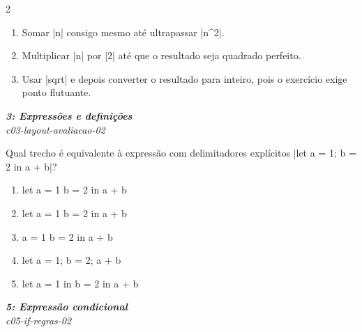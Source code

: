 \documentclass[a4paper,10pt,brazil]{article}
\begin{document}
\begin{multicols}{2}
\begin{enumerate}
  \item Somar \haskellinline|n| consigo mesmo até ultrapassar \haskellinline|n^2|.

  \item Multiplicar \haskellinline|n| por \haskellinline|2| até que o resultado seja quadrado perfeito.

  \item Usar \haskellinline|sqrt| e depois converter o resultado para inteiro, pois o exercício exige ponto flutuante.


\end{enumerate}

\begin{flushright}
  \footnotesize
  \textit{\textbf{3: Expressões e definições}}\\
  \textit{c03-layout-avaliacao-02}\\

\end{flushright}
Qual trecho é equivalente à expressão com delimitadores explícitos \haskellinline|let { a = 1; b = 2 } in a + b|?

\begin{enumerate}
  \item \begin{haskellcode}
let a = 1
    b = 2
in a + b
\end{haskellcode}

  \item \begin{haskellcode}
let a = 1
  b = 2
in a + b
\end{haskellcode}

  \item \begin{haskellcode}
a = 1
b = 2
in a + b
\end{haskellcode}

  \item \begin{haskellcode}
let a = 1; b = 2; a + b
\end{haskellcode}

  \item \begin{haskellcode}
let a = 1
in b = 2
in a + b
\end{haskellcode}


\end{enumerate}

\begin{flushright}
  \footnotesize
  \textit{\textbf{5: Expressão condicional}}\\
  \textit{c05-if-regras-02}\\


\end{flushright}
\end{multicols}
\end{document}
